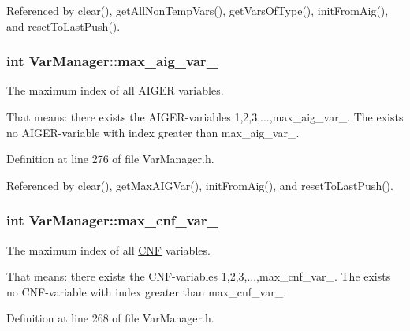 Referenced by clear(), get\-All\-Non\-Temp\-Vars(), get\-Vars\-Of\-Type(), init\-From\-Aig(), and reset\-To\-Last\-Push().

\hypertarget{classVarManager_af5877424c2c4ef563bd3278f85dd3c2d}{
\subsubsection[{max\-\_\-aig\-\_\-var\-\_\-}]{\setlength{\rightskip}{0pt plus 5cm}int Var\-Manager\-::max\-\_\-aig\-\_\-var\-\_\-\hspace{0.3cm}{\ttfamily [protected]}}}\label{classVarManager_af5877424c2c4ef563bd3278f85dd3c2d}


The maximum index of all A\-I\-G\-E\-R variables. 

That means\-: there exists the A\-I\-G\-E\-R-\/variables 1,2,3,...,max\-\_\-aig\-\_\-var\-\_\-. The exists no A\-I\-G\-E\-R-\/variable with index greater than max\-\_\-aig\-\_\-var\-\_\-. 

Definition at line 276 of file Var\-Manager.\-h.



Referenced by clear(), get\-Max\-A\-I\-G\-Var(), init\-From\-Aig(), and reset\-To\-Last\-Push().

\hypertarget{classVarManager_aa790c99974d2aa97ed1848e49c4c82c6}{
\subsubsection[{max\-\_\-cnf\-\_\-var\-\_\-}]{\setlength{\rightskip}{0pt plus 5cm}int Var\-Manager\-::max\-\_\-cnf\-\_\-var\-\_\-\hspace{0.3cm}{\ttfamily [protected]}}}\label{classVarManager_aa790c99974d2aa97ed1848e49c4c82c6}


The maximum index of all \hyperlink{classCNF}{C\-N\-F} variables. 

That means\-: there exists the C\-N\-F-\/variables 1,2,3,...,max\-\_\-cnf\-\_\-var\-\_\-. The exists no C\-N\-F-\/variable with index greater than max\-\_\-cnf\-\_\-var\-\_\-. 

Definition at line 268 of file Var\-Manager.\-h.



